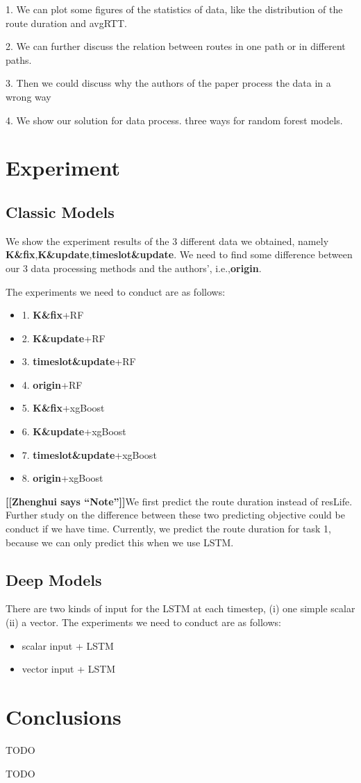 \documentclass[sigconf]{acmart}
\newcommand{\hui}[1]{{\bf \color{purple} [[Zhenghui says ``#1'']]}}
\begin{document}
1. We can plot some figures of the statistics of data, like the distribution of the route duration and avgRTT. 

2. We can further discuss the relation between routes in one path or in different paths.

3. Then we could discuss why the authors of the paper process the data in a wrong way

4. We show our solution for data process. three ways for random forest models.

\section{Experiment}
\subsection{Classic Models}
We show the experiment results of the 3 different data we obtained, namely \textbf{K\&fix},\textbf{K\&update},\textbf{timeslot\&update}. We need to find some difference between our 3 data processing methods and the authors', i.e.,\textbf{origin}. 

The experiments we need to conduct are as follows:
\begin{itemize}

\item 1. \textbf{K\&fix}+RF
\item 2. \textbf{K\&update}+RF
\item 3. \textbf{timeslot\&update}+RF
\item 4. \textbf{origin}+RF
\item 5. \textbf{K\&fix}+xgBoost
\item 6. \textbf{K\&update}+xgBoost
\item 7. \textbf{timeslot\&update}+xgBoost
\item 8. \textbf{origin}+xgBoost
\end{itemize}


\hui{Note}We first predict the route duration instead of resLife. Further study on the difference between these two predicting objective could be conduct if we have time. Currently, we predict the route duration for task 1, because we can only predict this when we use LSTM.


\subsection{Deep Models}

There are two kinds of input for the LSTM at each timestep, (i) one simple scalar (ii) a vector.
The experiments we need to conduct are as follows:
\begin{itemize}
\item scalar input + LSTM
\item vector input + LSTM
\end{itemize}

\section{Conclusions}
TODO

\begin{acks}
TODO
\end{acks}




 
\end{document}

